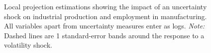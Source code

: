 \documentclass[a4paper,11pt,listof=nochaptergap,oneside,pointednumbers,bibtotoc,bigheadings,liststotoc]{scrbook}
\theoremstyle{mysatz}
\theoremstyle{mydefinition}
\theoremstyle{mybemerkung}
\begin{document}
\begin{figure}[!h]
   \centering
   \setlength\fboxsep{0pt}
   \setlength\fboxrule{0pt}
      \caption[Local projection estimations showing the impact of an uncertainty shock on industrial production and employment in manufacturing. All variables apart from uncertainty measures enter as logs.]{Local projection estimations showing the impact of an uncertainty shock on industrial production and employment in manufacturing. All variables apart from uncertainty measures enter as logs.
      \textit{Note:} Dashed lines are 1 standard-error bands around the response to a volatility shock.}
   \label{fig:locproj_plot_all_NoHP_until2008}
\end{figure}
\end{document}
